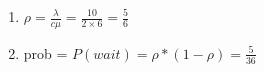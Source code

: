 \begin{enumerate}
  \item \phantom{text}
        \begin{latin}
          $\rho = \frac{\lambda}{c\mu } = \frac{10}{2\times6}=\frac{5}{6}$
        \end{latin}
  \item \phantom{text}
        \begin{latin}
          prob = $P(wait) = \rho * (1 - \rho) = \frac{5}{36}$
        \end{latin}
\end{enumerate}
